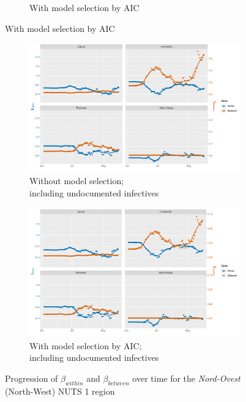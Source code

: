 \documentclass[12pt]{article}
\begin{document}
\begin{appendices}
\begin{figure}[H]
\begin{subfigure}{\textwidth}
    	      \caption{With model selection by AIC}
    	      \label{fig:beta_within_between_over_time_nordovest_aic}
    	    \end{subfigure}
    	\end{figure}
        \begin{figure}[H]\ContinuedFloat
    	    \begin{subfigure}{\textwidth}
    	      \centering
    	      \includegraphics[width=0.95\linewidth]{output/model3_lag3_betas_Nord-Ovest_UndocQuadratic_rolling.pdf}
    	      \caption{Without model selection; \\ including undocumented infectives}
    	      \label{fig:beta_within_between_over_time_nordovest_regular_undoc}
    	    \end{subfigure}\newline
    	    \begin{subfigure}{\textwidth}
    	      \centering
    	      \includegraphics[width=0.95\linewidth]{output/model3_lag3_betas_Nord-Ovest_aic_UndocQuadratic_rolling.pdf}
    	      \caption{With model selection by AIC; \\ including undocumented infectives}
    	      \label{fig:beta_within_between_over_time_nordovest_aic_undoc}
    	    \end{subfigure}
    	    \caption{Progression of $\beta_{within}$ and $\beta_{between}$ over time for the \textit{Nord-Ovest} (North-West) NUTS 1 region}
    	    \label{fig:beta_within_between_over_time_nordovest}
        \end{figure}
		

\end{appendices}
\end{document}
